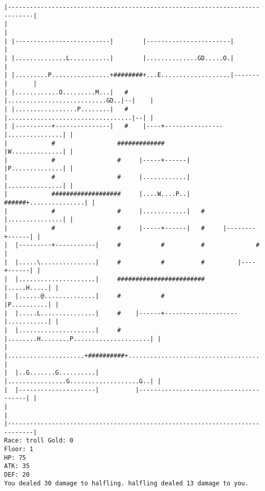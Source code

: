 \documentclass[11pt]{article}
\theoremstyle{plain}
\begin{document}
\begin{Verbatim}[fontsize=\small]
|-----------------------------------------------------------------------------|
|                                                                             |
| |--------------------------|        |-----------------------|               |
| |..............L...........|        |..............GD.....O.|               |
| |.........P................+########+...E...................|-------|       |
| |............O.........M...|   #    |...........................GD..|--|    |
| |.................P........|   #    |..................................|--| |
| |----------+---------------|   #    |----+----------------|...............| |
|            #                 #############                |W..............| |
|            #                 #     |-----+------|         |P..............| |
|            #                 #     |............|         |...............| |
|            ###################     |....W....P..|   ######+...............| |
|            #                 #     |............|   #     |...............| |
|            #                 #     |-----+------|   #     |--------+------| |
|  |---------+-----------|     #           #          #              #        |
|  |.....\...............|     #           #          #         |----+------| |
|  |.....................|     ########################         |.....H.....| |
|  |......@..............|     #           #                    |P..........| |
|  |.....L...............|     #    |------+--------------------|...........| |
|  |.....................|     #    |........H........P.....................| |
|  |.....................+##########+.......................................| |
|  |..G.......G..........|          |................G...................G..| |
|  |---------------------|          |---------------------------------------| |
|                                                                             |
|-----------------------------------------------------------------------------|
Race: troll Gold: 0                                                    Floor: 1
HP: 75
ATK: 35
DEF: 20
You dealed 30 damage to halfling. halfling dealed 13 damage to you.
\end{Verbatim}
\end{document}
